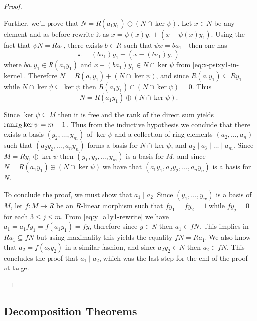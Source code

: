 \begin{proof}
\begin{enumerate}[(a)]
  Further, we'll prove that \(N = R (a_1 y_1) \oplus (N \cap \ker \psi)\). Let
  \(x \in N\) be any element and as before rewrite it as \(x = \psi(x) y_1 + (x
  - \psi(x) y_1)\). Using the fact that \(\psi N = R a_1\), there exists \(b \in
  R\) such that \(\psi x = b a_1\)---then one has
  \[
  x = (b a_1) y_1 + (x - (b a_1) y_1)
  \]
  where \(b a_1 y_1 \in R (a_1 y_1)\) and \(x - (b a_1) y_1 \in N \cap \ker \psi\)
  from \cref{eq:x-psixy1-in-kernel}. Therefore \(N = R (a_1 y_1) + (N \cap \ker
  \psi)\), and since \(R(a_1 y_1) \subseteq R y_1\) while \(N \cap \ker \psi
  \subseteq \ker \psi\) then \(R(a_1 y_1) \cap (N \cap \ker \psi) = 0\). Thus
  \[
  N = R(a_1 y_1) \oplus (N \cap \ker \psi).
  \]

  Since \(\ker \psi \subseteq M\) then it is free and the rank of the direct sum
  yields \(\operatorname{rank}_R \ker \psi = m - 1\). Thus from the inductive hypothesis we
  conclude that there exists a basis \((y_2, \dots, y_m)\) of \(\ker \psi\) and
  a collection of ring elements \((a_2, \dots, a_n)\) such that
  \((a_2 y_2, \dots, a_n y_n)\) forms a basis for \(N \cap \ker \psi\), and
  \(a_2 \mid a_3 \mid \dots \mid a_m\). Since \(M = R y_1 \oplus \ker \psi\)
  then \((y_1, y_2, \dots, y_m)\) is a basis for \(M\), and since \(N = R (a_1
  y_1) \oplus (N \cap \ker \psi)\) we have that \((a_1 y_1, a_2 y_2, \dots, a_n
  y_n)\) is a basis for \(N\).

  To conclude the proof, we must show that \(a_1 \mid a_2\). Since
  \((y_1, \dots, y_m)\) is a basis of \(M\), let \(f: M \to R\) be an
  \(R\)-linear morphism such that \(f y_1 = f y_2 = 1\) while \(f y_j = 0\) for
  each \(3 \leq j \leq m\). From \cref{eq:y=a1y1-rewrite} we have
  \(a_1 = a_1 f y_1 = f(a_1 y_1) = f y\), therefore since \(y \in N\) then \(a_1
  \in f N\). This implies in \(R a_1 \subseteq f N\) but using maximality this
  yields the equality \(f N = R a_1\). We also know that \(a_2 = f(a_2 y_2)\) in
  a similar fashion, and since \(a_2 y_2 \in N\) then \(a_2 \in f N\). This
  concludes the proof that \(a_1 \mid a_2\), which was the last step for the end
  of the proof at large.
\end{enumerate}
\end{proof}

\subsection{Decomposition Theorems}

